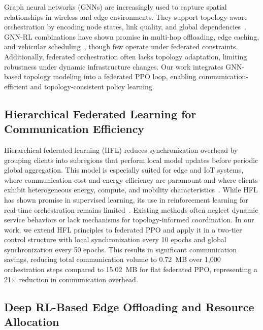 \documentclass[conference]{IEEEtran}
\begin{document}
	Graph neural networks (GNNs) are increasingly used to capture spatial relationships in wireless and edge environments. They support topology-aware orchestration by encoding node states, link quality, and global dependencies~\cite{zhang2024optimizing,jere2023distributed}. GNN-RL combinations have shown promise in multi-hop offloading, edge caching, and vehicular scheduling~\cite{makris2024gnnrl,hao2021urllc}, though few operate under federated constraints. Additionally, federated orchestration often lacks topology adaptation, limiting robustness under dynamic infrastructure changes. Our work integrates GNN-based topology modeling into a federated PPO loop, enabling communication-efficient and topology-consistent policy learning.
	
	
	\subsection{Hierarchical Federated Learning for Communication Efficiency}
	
	\textcolor{revblue}{Hierarchical federated learning (HFL) reduces synchronization overhead by grouping clients into subregions that perform local model updates before periodic global aggregation. This model is especially suited for edge and IoT systems, where communication cost and energy efficiency are paramount and where clients exhibit heterogeneous energy, compute, and mobility characteristics~\cite{tan2023selfadaptive,huang2022workercentric}. While HFL has shown promise in supervised learning, its use in reinforcement learning for real-time orchestration remains limited~\cite{tam2025graph}. Existing methods often neglect dynamic service behaviors or lack mechanisms for topology-informed coordination. In our work, we extend HFL principles to federated PPO and apply it in a two-tier control structure with local synchronization every 10 epochs and global synchronization every 50 epochs. This results in significant communication savings, reducing total communication volume to 0.72~MB over 1{,}000 orchestration steps compared to 15.02~MB for flat federated PPO, representing a 21$\times$ reduction in communication overhead.}
	
	
	\subsection{Deep RL-Based Edge Offloading and Resource Allocation}
	
\end{document}
